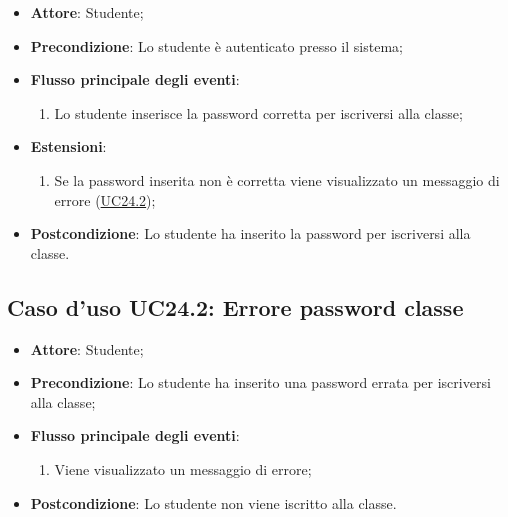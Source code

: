\documentclass[12pt,a4paper]{article}
\begin{document}
\begin{itemize}

\item \textbf{Attore}: Studente; 
\item \textbf{Precondizione}: Lo studente è autenticato presso il sistema;

\item \textbf{Flusso principale degli eventi}:
\begin{enumerate}
	\item Lo studente inserisce la password corretta per iscriversi alla classe;
	
\end{enumerate}
\item \textbf{Estensioni}:
\begin{enumerate}
	\item Se la password inserita non è corretta viene visualizzato un messaggio di errore (\hyperlink{UC24.2}{UC24.2});
	
\end{enumerate}
\item \textbf{Postcondizione}: Lo studente ha inserito la password per iscriversi alla classe.
\end{itemize}
\hypertarget{UC24.2}{}
\subsection{Caso d'uso UC24.2: Errore password classe}

\begin{itemize}

\item \textbf{Attore}: Studente; 
\item \textbf{Precondizione}: Lo studente ha inserito una password errata per iscriversi alla classe;

\item \textbf{Flusso principale degli eventi}:
\begin{enumerate}
	\item Viene visualizzato un messaggio di errore;
	
\end{enumerate}
\item \textbf{Postcondizione}: Lo studente non viene iscritto alla classe.
\end{itemize}
\hypertarget{UC25}{}
\end{document}
